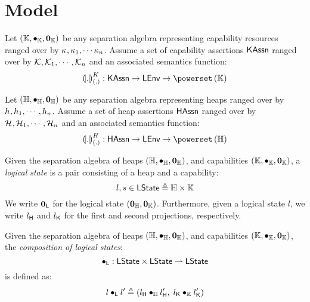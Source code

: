 %
%

%
%
\section*{Model}
\begin{parameter}
Let $\left(\mathbb{K}, \bullet_{\mathbb{K}}, \mathbf{0}_{\mathbb{K}}\right)$ be any separation algebra representing capability resources ranged over by $\kappa_{}, \kappa_{1}, \cdots  \kappa_{n}$. Assume a set of capability assertions $\textsf{KAssn}$ ranged over by $\mathcal{K}_{}, \mathcal{K}_{1}, \cdots, \mathcal{K}_{n}$ and an associated semantics function:
%
\[
	\semK[\blankArg]{.} : \KAssertions \rightarrow \LEnv \rightarrow \pset{\Caps}
\]
%
\end{parameter}
%
%
\begin{parameter}
Let $(\mathbb{H}, \bullet_{\mathbb{H}}, \mathbf{0}_{\mathbb{H}})$ be any separation algebra representing heaps ranged over by $h_{}, h_{1}, \cdots, h_{n}$. Assume a set of heap assertions $\textsf{HAssn}$ ranged over by $\mathcal{H}_{}, \mathcal{H}_{1}, \cdots, \mathcal{H}_{n}$ and an associated semantics function:
%
\[
	\semH[\blankArg]{.} : \HAssertions \rightarrow \LEnv \rightarrow \pset{\Heaps}
\]
%
\end{parameter}
%
%
\begin{definition}
Given the separation algebra of heaps $(\mathbb{H}, \bullet_{\mathbb{H}}, \mathbf{0}_{\mathbb{H}})$, and capabilities $\left(\mathbb{K}, \bullet_{\mathbb{K}}, \mathbf{0}_{\mathbb{K}}\right)$, a \emph{logical state} is a pair consisting of a heap and a capability:
%
\[
	l, s \in \textsf{LState} \triangleq \mathbb{H} \times \mathbb{K}
\]
%
We write $\mathbf{0}_{\textsf{L}}$ for the logical state $(\mathbf{0}_{\mathbb{H}}, \mathbf{0}_{\mathbb{K}})$. Furthermore, given a logical state $l$, we write $l_{\textsf{H}}$ and $l_{\textsf{K}}$ for the first and second projections, respectively.
\end{definition}
%
%
\begin{definition}
Given the separation algebra of heaps $(\mathbb{H}, \bullet_{\mathbb{H}}, \mathbf{0}_{\mathbb{H}})$, and capabilities $\left(\mathbb{K}, \bullet_{\mathbb{K}}, \mathbf{0}_{\mathbb{K}}\right)$, the \emph{composition of logical states}:
%
\[
	\bullet_{\textsf{L}} : \textsf{LState} \times \textsf{LState} \rightharpoonup \textsf{LState}
\]
%
is defined as:
%
\[
	l \bullet_{\textsf{L}} l' \triangleq (l_{\textsf{H}} \bullet_{\mathbb{H}} l'_{\textsf{H}},\; l_{\textsf{K}} \bullet_{\mathbb{K}} l'_{\textsf{K}})
\]
%
\end{definition}
